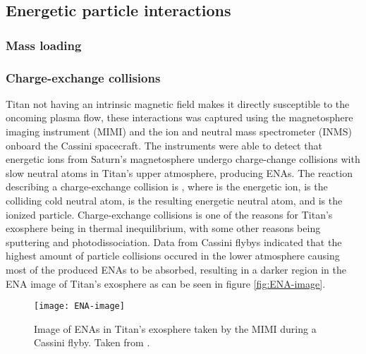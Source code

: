 \documentclass[12pt, parskip=full*, abstract]{scrartcl}
\begin{document}

\subsection{Energetic particle interactions}

\subsubsection{Mass loading}

\subsubsection{Charge-exchange collisions}
\parencite{titan-exosphere-interaction}
Titan not having an intrinsic magnetic field makes it directly susceptible to the oncoming plasma flow, these interactions was captured using the magnetosphere imaging instrument (MIMI) and the ion and neutral mass spectrometer (INMS) onboard the Cassini spacecraft. The instruments were able to detect that energetic ions from Saturn's magnetosphere undergo charge-change collisions with slow neutral atoms in Titan's upper atmosphere, producing ENAs. The reaction describing a charge-exchange collision is , where  is the energetic ion,  is the colliding cold neutral atom,  is the resulting energetic neutral atom, and  is the ionized particle. Charge-exchange collisions is one of the reasons for Titan's exosphere being in thermal inequilibrium, with some other reasons being sputtering and photodissociation. Data from Cassini flybys indicated that the highest amount of particle collisions occured in the lower atmosphere causing most of the produced ENAs to be absorbed, resulting in a darker region in the ENA image of Titan's exosphere as can be seen in figure \ref{fig:ENA-image}.

\begin{figure}[htbp]
	\centering
	\texttt{[image: ENA-image]}
	\caption{Image of ENAs in Titan's exosphere taken by the MIMI during a Cassini flyby. Taken from \textcite{titan-exosphere-interaction}.}
	\label{ENA-image}
\end{figure}

\end{document}
